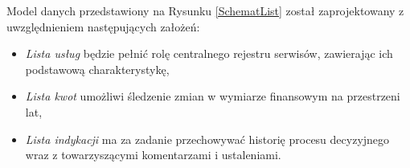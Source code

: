 

Model danych przedstawiony na Rysunku \ref{SchematList} został zaprojektowany z uwzględnieniem następujących założeń:

\begin{itemize}
  \item \emph{Lista usług} będzie pełnić rolę centralnego rejestru serwisów, zawierając ich podstawową charakterystykę,
  \item \emph{Lista kwot} umożliwi śledzenie zmian w wymiarze finansowym na przestrzeni lat,
  \item \emph{Lista indykacji} ma za zadanie przechowywać historię procesu decyzyjnego wraz z towarzyszącymi komentarzami i ustaleniami.
\end{itemize}



